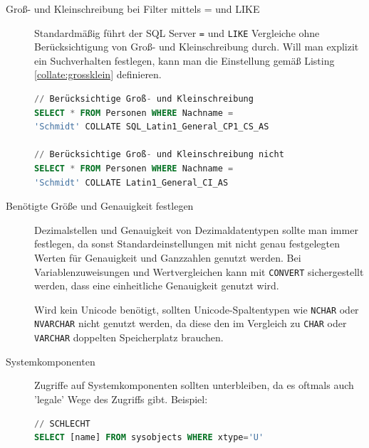 \documentclass[12pt,ngerman,a4paper,index=totoc,twoside]{scrartcl}
\newcommand{\sql}[1]{\texttt{#1}}
\newcommand{\lwidth}{0.75}
\begin{document}
\begin{description}
	\item[Groß- und Kleinschreibung bei Filter mittels = und LIKE] 

Standardmäßig führt der SQL Server \sql{=} und \sql{LIKE} Vergleiche ohne Berücksichtigung von Groß- und Kleinschreibung durch. Will man explizit ein Suchverhalten festlegen, kann man die Einstellung gemäß Listing \ref{collate:grossklein} definieren.

\begin{center}
\begin{minipage}{\lwidth\textwidth}
\begin{lstlisting}[language={SQL},caption={Groß- und Kleinschreibung bei Suchanfragen},label={collate:grossklein}]
// Berücksichtige Groß- und Kleinschreibung
SELECT * FROM Personen WHERE Nachname =
'Schmidt' COLLATE SQL_Latin1_General_CP1_CS_AS

// Berücksichtige Groß- und Kleinschreibung nicht
SELECT * FROM Personen WHERE Nachname =
'Schmidt' COLLATE Latin1_General_CI_AS
\end{lstlisting}
\end{minipage}
\end{center} 

\item[Benötigte Größe und Genauigkeit festlegen] 
	
Dezimalstellen und Genauigkeit von Dezimaldatentypen sollte man immer festlegen, da sonst Standardeinstellungen mit nicht genau festgelegten Werten für Genauigkeit und Ganzzahlen genutzt werden. Bei Variablenzuweisungen und Wertvergleichen kann mit \sql{CONVERT}  sichergestellt werden, dass eine einheitliche Genauigkeit genutzt wird. 

Wird kein Unicode benötigt, sollten Unicode-Spaltentypen wie \sql{NCHAR} oder \sql{NVARCHAR} nicht genutzt werden, da diese den im Vergleich zu \sql{CHAR} oder \sql{VARCHAR} doppelten Speicherplatz brauchen. 

\item[Systemkomponenten] 
	
Zugriffe auf Systemkomponenten sollten unterbleiben, da es oftmals auch 'legale' Wege des Zugriffs gibt. Beispiel:

\begin{center}
\begin{minipage}{0.75\textwidth}
\begin{lstlisting}[language={SQL},caption={Zugriffe auf Metainformationen der Datenbank},label={sysobjects1}]
// SCHLECHT
SELECT [name] FROM sysobjects WHERE xtype='U'


\end{lstlisting}
\end{minipage}
\end{center}
\end{description}
\end{document}
